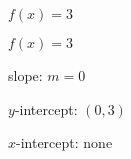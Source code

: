 {$f(x) = 3$}
{$f(x) = 3$

slope: $m =0$ 

$y$-intercept:  $(0,3)$

$x$-intercept: none
\begin{center}
\end{center}}
